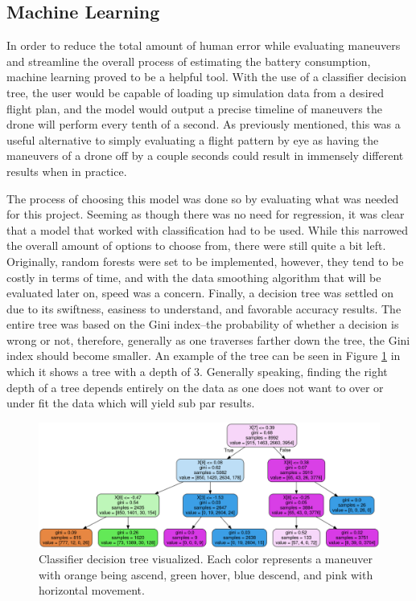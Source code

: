 \documentclass{article}
\begin{document}
\subsection{Machine Learning}
In order to reduce the total amount of human error while evaluating maneuvers and streamline the overall process of estimating the battery consumption, machine learning proved to be a helpful tool. With the use of a classifier decision tree, the user would be capable of loading up simulation data from a desired flight plan, and the model would output a precise timeline of maneuvers the drone will perform every tenth of a second. As previously mentioned, this was a useful alternative to simply evaluating a flight pattern by eye as having the maneuvers of a drone off by a couple seconds could result in immensely different results when in practice. 

The process of choosing this model was done so by evaluating what was needed for this project. Seeming as though there was no need for regression, it was clear that a model that worked with classification had to be used. While this narrowed the overall amount of options to choose from, there were still quite a bit left. Originally, random forests were set to be implemented, however, they tend to be costly in terms of time, and with the data smoothing algorithm that will be evaluated later on, speed was a concern. Finally, a decision tree was settled on due to its swiftness, easiness to understand, and favorable accuracy results. The entire tree was based on the Gini index–the probability of whether a decision is wrong or not, therefore, generally as one traverses farther down the tree, the Gini index should become smaller. An example of the tree can be seen in Figure \ref{fig:tree} in which it shows a tree with a depth of 3. Generally speaking, finding the right depth of a tree depends entirely on the data as one does not want to over or under fit the data which will yield sub par results. \par

\begin{figure}[!h]
	\centering
	\includegraphics[scale=0.25]{images/tree}
	\caption{Classifier decision tree visualized. Each color represents a maneuver with orange being ascend, green hover, blue descend, and pink with horizontal movement.}
	\label{fig:tree}
\end{figure}
\end{document}
